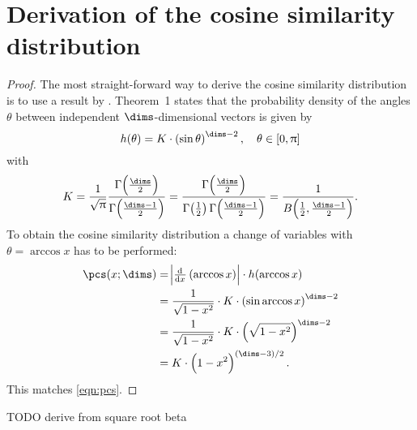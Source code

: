 \chapter{Derivation of the cosine similarity distribution}
\begin{proof}
The most straight-forward way to derive the cosine similarity distribution is to use a result by \textcite{cai2013}.
Theorem~1 states that the probability density of the angles $\theta$ between independent $\dims$-dimensional vectors is given by
\begin{equation}
    h(\theta) = K \cdot \del{\sin \theta}^{\dims - 2},\quad \theta \in \sbr{0, \uppi}
\end{equation}
with
\begin{equation}
    K = \frac{1}{\sqrt{\uppi}} \frac{\Gamma\!\del{\frac{\dims}{2}}}{\Gamma\!\del{\frac{\dims - 1}{2}}} = \frac{\Gamma\!\del{\frac{\dims}{2}}}{\Gamma\!\del{\frac{1}{2}} \Gamma\!\del{\frac{\dims - 1}{2}}} = \frac{1}{B\!\del{\frac{1}{2}, \frac{\dims -1}{2}}} \text{.}
\end{equation}
To obtain the cosine similarity distribution a change of variables with $\theta = \arccos x$ has to be performed:
\begin{align}
    \pcs(x; \dims) &= \abs{\od{}{x} \del{\arccos x}} \cdot h(\arccos x) \\
    &= \frac{1}{\sqrt{1 - x^2}} \cdot K \cdot \del{\sin \arccos x}^{\dims - 2} \\
    &= \frac{1}{\sqrt{1 - x^2}} \cdot K \cdot \del{\sqrt{1 - x^2}}^{\dims - 2} \\
    &= K \cdot \del{1 - x^2}^{\del{\dims - 3}/2} \text{.}
\end{align}
This matches \cref{eqn:pcs}.
\end{proof}

TODO derive from square root beta

